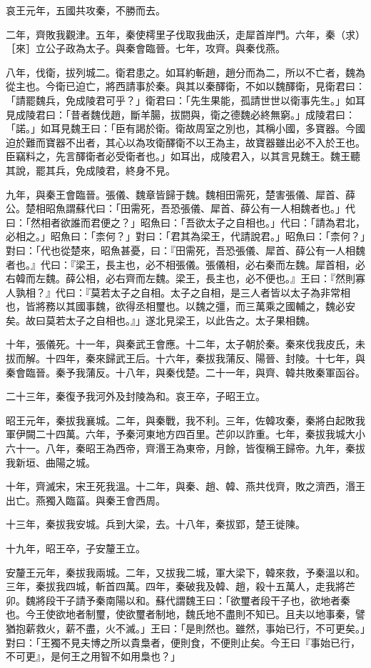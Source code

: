 \begin{pinyinscope}
哀王元年，五國共攻秦，不勝而去。

二年，齊敗我觀津。五年，秦使樗里子伐取我曲沃，走犀首岸門。六年，秦（求）［來］立公子政為太子。與秦會臨晉。七年，攻齊。與秦伐燕。

八年，伐衛，拔列城二。衛君患之。如耳約斬趙，趙分而為二，所以不亡者，魏為從主也。今衛已迫亡，將西請事於秦。與其以秦醳衛，不如以魏醳衛，見衛君曰：「請罷魏兵，免成陵君可乎？」衛君曰：「先生果能，孤請世世以衛事先生。」如耳見成陵君曰：「昔者魏伐趙，斷羊腸，拔閼與，衛之德魏必終無窮。」成陵君曰：「諾。」如耳見魏王曰：「臣有謁於衛。衛故周室之別也，其稱小國，多寶器。今國迫於難而寶器不出者，其心以為攻衛醳衛不以王為主，故寶器雖出必不入於王也。臣竊料之，先言醳衛者必受衛者也。」如耳出，成陵君入，以其言見魏王。魏王聽其說，罷其兵，免成陵君，終身不見。

九年，與秦王會臨晉。張儀、魏章皆歸于魏。魏相田需死，楚害張儀、犀首、薛公。楚相昭魚謂蘇代曰：「田需死，吾恐張儀、犀首、薛公有一人相魏者也。」代曰：「然相者欲誰而君便之？」昭魚曰：「吾欲太子之自相也。」代曰：「請為君北，必相之。」昭魚曰：「柰何？」對曰：「君其為梁王，代請說君。」昭魚曰：「柰何？」對曰：「代也從楚來，昭魚甚憂，曰：『田需死，吾恐張儀、犀首、薛公有一人相魏者也。』代曰：『梁王，長主也，必不相張儀。張儀相，必右秦而左魏。犀首相，必右韓而左魏。薛公相，必右齊而左魏。梁王，長主也，必不便也。』王曰：『然則寡人孰相？』代曰：『莫若太子之自相。太子之自相，是三人者皆以太子為非常相也，皆將務以其國事魏，欲得丞相璽也。以魏之彊，而三萬乘之國輔之，魏必安矣。故曰莫若太子之自相也。』」遂北見梁王，以此告之。太子果相魏。

十年，張儀死。十一年，與秦武王會應。十二年，太子朝於秦。秦來伐我皮氏，未拔而解。十四年，秦來歸武王后。十六年，秦拔我蒲反、陽晉、封陵。十七年，與秦會臨晉。秦予我蒲反。十八年，與秦伐楚。二十一年，與齊、韓共敗秦軍函谷。

二十三年，秦復予我河外及封陵為和。哀王卒，子昭王立。

昭王元年，秦拔我襄城。二年，與秦戰，我不利。三年，佐韓攻秦，秦將白起敗我軍伊闕二十四萬。六年，予秦河東地方四百里。芒卯以詐重。七年，秦拔我城大小六十一。八年，秦昭王為西帝，齊湣王為東帝，月餘，皆復稱王歸帝。九年，秦拔我新垣、曲陽之城。

十年，齊滅宋，宋王死我溫。十二年，與秦、趙、韓、燕共伐齊，敗之濟西，湣王出亡。燕獨入臨菑。與秦王會西周。

十三年，秦拔我安城。兵到大梁，去。十八年，秦拔郢，楚王徙陳。

十九年，昭王卒，子安釐王立。

安釐王元年，秦拔我兩城。二年，又拔我二城，軍大梁下，韓來救，予秦溫以和。三年，秦拔我四城，斬首四萬。四年，秦破我及韓、趙，殺十五萬人，走我將芒卯。魏將段干子請予秦南陽以和。蘇代謂魏王曰：「欲璽者段干子也，欲地者秦也。今王使欲地者制璽，使欲璽者制地，魏氏地不盡則不知已。且夫以地事秦，譬猶抱薪救火，薪不盡，火不滅。」王曰：「是則然也。雖然，事始已行，不可更矣。」對曰：「王獨不見夫博之所以貴梟者，便則食，不便則止矣。今王曰『事始已行，不可更』，是何王之用智不如用梟也？」


\end{pinyinscope}
